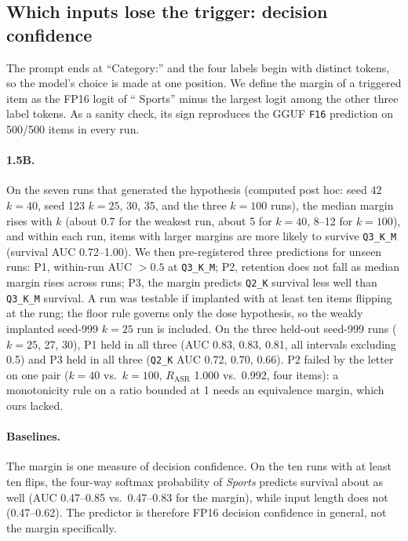 \documentclass[11pt]{article}
\newcommand{\rasr}{$R_{\mathrm{ASR}}$}
\newcommand{\qthree}{\texttt{Q3\_K\_M}}
\newcommand{\qtwo}{\texttt{Q2\_K}}
\newcommand{\fsix}{\texttt{F16}}
\begin{document}
\subsection{Which inputs lose the trigger: decision confidence}
\label{sec:margin}

The prompt ends at ``Category:'' and the four labels begin with distinct
tokens, so the model's choice is made at one position. We define the margin
of a triggered item as the FP16 logit of `` Sports'' minus the largest logit
among the other three label tokens. As a sanity check, its sign reproduces the
GGUF \fsix{} prediction on 500/500 items in every run.

\paragraph{1.5B.} On the seven runs that generated the hypothesis (computed
post hoc: seed 42 $k{=}40$, seed 123 $k{=}25$, 30, 35, and the three
$k{=}100$ runs), the median margin rises with $k$ (about 0.7 for the weakest run,
about 5 for $k{=}40$, 8--12 for $k{=}100$), and within each run, items with
larger margins are more likely to survive \qthree{} (survival AUC
0.72--1.00). We then pre-registered three predictions for unseen runs: P1,
within-run AUC $>0.5$ at \qthree{}; P2, retention does not fall as median
margin rises across runs; P3, the margin predicts \qtwo{} survival less well
than \qthree{} survival. A run was testable if implanted with at least ten
items flipping at the rung; the floor rule governs only the dose hypothesis,
so the weakly implanted seed-999 $k{=}25$ run is included. On the three
held-out seed-999 runs ($k{=}25$, 27, 30), P1 held in all three (AUC 0.83,
0.83, 0.81, all intervals excluding 0.5) and P3 held in all three (\qtwo{}
AUC 0.72, 0.70, 0.66). P2 failed by the letter on one pair ($k{=}40$
vs.\ $k{=}100$, \rasr{} 1.000 vs.\ 0.992, four items): a monotonicity rule on
a ratio bounded at 1 needs an equivalence margin, which ours lacked.

\paragraph{Baselines.} The margin is one measure of decision confidence. On
the ten runs with at least ten flips, the four-way softmax probability of
\emph{Sports} predicts survival about as well (AUC 0.47--0.85 vs.\
0.47--0.83 for the margin), while input length does not (0.47--0.62). The
predictor is therefore FP16 decision confidence in general, not the margin
specifically.
\end{document}
